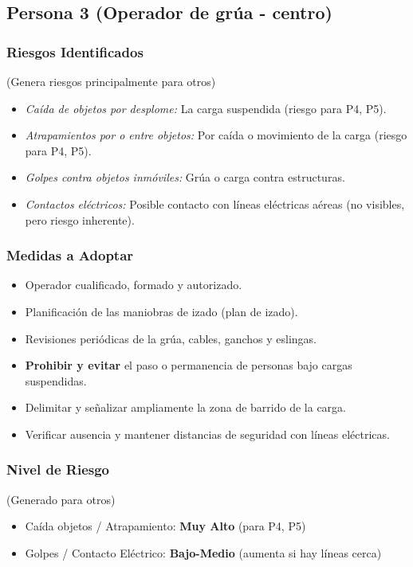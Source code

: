 \documentclass[12pt,a4paper]{article}
\begin{document}
	\bigskip\hrulefill\bigskip
	
	\subsection{Persona 3 (Operador de grúa - centro)}
	
	\subsubsection{Riesgos Identificados} (Genera riesgos principalmente para otros)
	\begin{itemize}
		\item \textit{Caída de objetos por desplome:} La carga suspendida (riesgo para P4, P5).
		\item \textit{Atrapamientos por o entre objetos:} Por caída o movimiento de la carga (riesgo para P4, P5).
		\item \textit{Golpes contra objetos inmóviles:} Grúa o carga contra estructuras.
		\item \textit{Contactos eléctricos:} Posible contacto con líneas eléctricas aéreas (no visibles, pero riesgo inherente).
	\end{itemize}
	
	\subsubsection{Medidas a Adoptar}
	\begin{itemize}
		\item Operador cualificado, formado y autorizado.
		\item Planificación de las maniobras de izado (plan de izado).
		\item Revisiones periódicas de la grúa, cables, ganchos y eslingas.
		\item \textbf{Prohibir y evitar} el paso o permanencia de personas bajo cargas suspendidas.
		\item Delimitar y señalizar ampliamente la zona de barrido de la carga.
		\item Verificar ausencia y mantener distancias de seguridad con líneas eléctricas.
	\end{itemize}
	
	\subsubsection{Nivel de Riesgo} (Generado para otros)
	\begin{itemize}
		\item Caída objetos / Atrapamiento: \textbf{Muy Alto} (para P4, P5)
		\item Golpes / Contacto Eléctrico: \textbf{Bajo-Medio} (aumenta si hay líneas cerca)
	\end{itemize}
	
\end{document}
